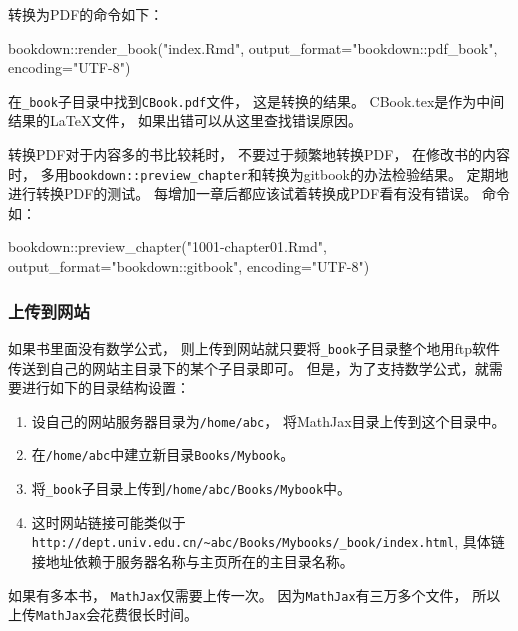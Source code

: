 \documentclass[
]{article}
\newenvironment{Shaded}{\begin{snugshade}}{\end{snugshade}}
\newcommand{\AttributeTok}[1]{\textcolor[rgb]{0.77,0.63,0.00}{#1}}
\newcommand{\FunctionTok}[1]{\textcolor[rgb]{0.00,0.00,0.00}{#1}}
\newcommand{\NormalTok}[1]{#1}
\newcommand{\SpecialCharTok}[1]{\textcolor[rgb]{0.00,0.00,0.00}{#1}}
\newcommand{\StringTok}[1]{\textcolor[rgb]{0.31,0.60,0.02}{#1}}
\providecommand{\tightlist}{%
  \setlength{\itemsep}{0pt}\setlength{\parskip}{0pt}}
\begin{document}
转换为PDF的命令如下：

\begin{Shaded}
\begin{Highlighting}[]
\NormalTok{bookdown}\SpecialCharTok{::}\FunctionTok{render\_book}\NormalTok{(}\StringTok{"index.Rmd"}\NormalTok{, }
  \AttributeTok{output\_format=}\StringTok{"bookdown::pdf\_book"}\NormalTok{, }\AttributeTok{encoding=}\StringTok{"UTF{-}8"}\NormalTok{)}
\end{Highlighting}
\end{Shaded}

在\texttt{\_book}子目录中找到\texttt{CBook.pdf}文件，
这是转换的结果。
CBook.tex是作为中间结果的LaTeX文件，
如果出错可以从这里查找错误原因。

转换PDF对于内容多的书比较耗时，
不要过于频繁地转换PDF，
在修改书的内容时，
多用\texttt{bookdown::preview\_chapter}和转换为gitbook的办法检验结果。
定期地进行转换PDF的测试。
每增加一章后都应该试着转换成PDF看有没有错误。
命令如：

\begin{Shaded}
\begin{Highlighting}[]
\NormalTok{bookdown}\SpecialCharTok{::}\FunctionTok{preview\_chapter}\NormalTok{(}\StringTok{"1001{-}chapter01.Rmd"}\NormalTok{, }
  \AttributeTok{output\_format=}\StringTok{"bookdown::gitbook"}\NormalTok{, }\AttributeTok{encoding=}\StringTok{"UTF{-}8"}\NormalTok{)}
\end{Highlighting}
\end{Shaded}

\hypertarget{usage-website}{%
\subsubsection{上传到网站}\label{usage-website}}

如果书里面没有数学公式，
则上传到网站就只要将\texttt{\_book}子目录整个地用ftp软件传送到自己的网站主目录下的某个子目录即可。
但是，为了支持数学公式，就需要进行如下的目录结构设置：

\begin{enumerate}
\def\labelenumi{\arabic{enumi}.}
\tightlist
\item
  设自己的网站服务器目录为\texttt{/home/abc}，
  将MathJax目录上传到这个目录中。
\item
  在\texttt{/home/abc}中建立新目录\texttt{Books/Mybook}。
\item
  将\texttt{\_book}子目录上传到\texttt{/home/abc/Books/Mybook}中。
\item
  这时网站链接可能类似于\texttt{http://dept.univ.edu.cn/\textasciitilde{}abc/Books/Mybooks/\_book/index.html},
  具体链接地址依赖于服务器名称与主页所在的主目录名称。
\end{enumerate}

如果有多本书，
\texttt{MathJax}仅需要上传一次。
因为\texttt{MathJax}有三万多个文件，
所以上传\texttt{MathJax}会花费很长时间。

\printbibliography
\end{document}
